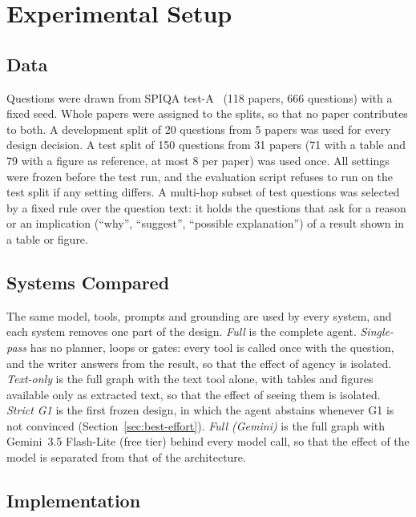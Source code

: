 \section{Experimental Setup}
\label{sec:setup}

\subsection{Data}

Questions were drawn from SPIQA test-A~\cite{pramanick2024spiqa} (118 papers, 666
questions) with a fixed seed. Whole papers were assigned to the splits, so that no
paper contributes to both. A development split of 20 questions from 5 papers was used
for every design decision. A test split of 150 questions from 31 papers (71 with a
table and 79 with a figure as reference, at most 8 per paper) was used once. All
settings were frozen before the test run, and the evaluation script refuses to run on
the test split if any setting differs. A multi-hop subset of \nMultihopN{} test
questions was selected by a fixed rule over the question text: it holds the questions
that ask for a reason or an implication (``why'', ``suggest'', ``possible
explanation'') of a result shown in a table or figure.

\subsection{Systems Compared}

The same model, tools, prompts and grounding are used by every system, and each system
removes one part of the design. \emph{Full} is the complete agent. \emph{Single-pass}
has no planner, loops or gates: every tool is called once with the question, and the
writer answers from the result, so that the effect of agency is isolated.
\emph{Text-only} is the full graph with the text tool alone, with tables and figures
available only as extracted text, so that the effect of seeing them is isolated.
\emph{Strict G1} is the first frozen design, in which the agent abstains whenever G1
is not convinced (Section~\ref{sec:best-effort}). \emph{Full (Gemini)} is the full graph
with Gemini~3.5 Flash-Lite (free tier) behind every model call, so that the effect of
the model is separated from that of the architecture.

\subsection{Implementation}

